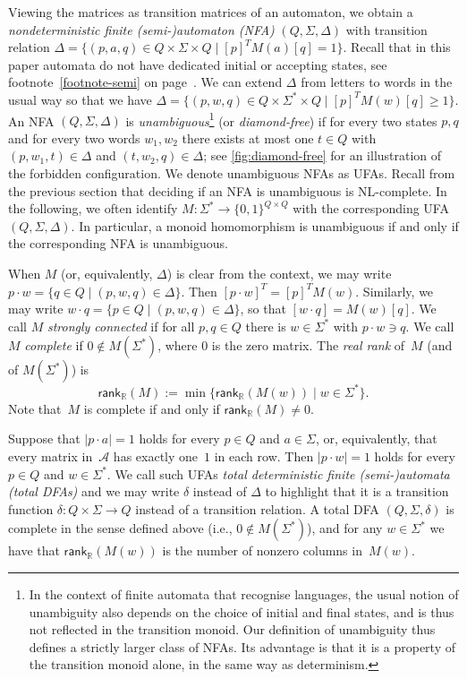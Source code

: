 \documentclass[11pt,a4paper]{amsart}
\newcommand{\Aa}{\mathcal{A}}
\newcommand{\NL}
{\textnormal{\textsf{NL}}\xspace}
\newcommand{\rkr}{\mathsf{rank}_{\mathbb{R}}}
\theoremstyle{plain}
\theoremstyle{definition}
\theoremstyle{defC}
\theoremstyle{thmC}
\theoremstyle{plain}
\numberwithin{equation}{section}
\begin{document}
\noindent
Viewing the matrices as transition matrices of an automaton, we obtain a \emph{nondeterministic finite (semi-)automaton (NFA)} $(Q, \Sigma, \Delta)$ with transition relation $\Delta = \{(p,a,q) \in Q \times \Sigma \times Q \mid [p]^T M(a) [q] = 1\}$.
Recall that in this paper automata do not have dedicated initial or accepting states, see footnote~\ref{footnote-semi} on page~\pageref{footnote-semi}.
We can extend $\Delta$ from letters to words in the usual way so that we have $\Delta = \{(p,w,q) \in Q \times \Sigma^* \times Q \mid [p]^T M(w) [q] \ge 1\}$.
An NFA $(Q, \Sigma, \Delta)$ is \emph{unambiguous}\footnote{In the context of finite automata that recognise languages, the usual notion of unambiguity also depends on the choice of initial and final states, and is thus not reflected in the transition monoid. Our definition of unambiguity thus defines a strictly larger class of NFAs. Its advantage is that it is a property of the transition monoid alone, in the same way as determinism.} (or \emph{diamond-free}) if for every two states $p,q$ and for every two words $w_1, w_2$ there exists at most one $t \in Q$ with $(p,w_1,t) \in \Delta$ and $(t,w_2,q) \in \Delta$; see \autoref{fig:diamond-free} for an illustration of the forbidden configuration. We denote unambiguous NFAs as UFAs. Recall from the previous section that deciding if an NFA is unambiguous is \NL-complete. In the following, we often identify $M \colon \Sigma^* \to \{0,1\}^{Q \times Q}$ with the corresponding UFA $(Q, \Sigma, \Delta)$. In particular, a monoid homomorphism is unambiguous if and only if the corresponding NFA is unambiguous.


When $M$ (or, equivalently, $\Delta$) is clear from the context, we may write $p \cdot w = \{q \in Q \mid (p,w,q) \in \Delta\}$.
Then $[p \cdot w]^T = [p]^T M(w)$.
Similarly, we may write $w \cdot q = \{p \in Q \mid (p,w,q) \in \Delta\}$, so that $[w \cdot q] = M(w) [q]$. 
We call $M$ \emph{strongly connected} if for all $p,q \in Q$ there is $w \in \Sigma^*$ with $p \cdot w \ni q$. 
We call $M$ \emph{complete} if $0 \not\in M(\Sigma^*)$, where $0$ is the zero matrix.
The \emph{real rank} of~$M$ (and of $M(\Sigma^*)$) is 
\[\rkr(M) := \min\{\rkr(M(w)) \mid w \in \Sigma^*\}.\]
Note that~$M$ is complete if and only if $\rkr(M) \ne 0$.

Suppose that $|p \cdot a| = 1$ holds for every $p \in Q$ and $a \in \Sigma$, or, equivalently, that every matrix in~$\Aa$ has exactly one~$1$ in each row.
Then $|p \cdot w| = 1$ holds for every $p \in Q$ and $w \in \Sigma^*$.
We call such UFAs \emph{total deterministic finite (semi-)automata (total DFAs)} and we may write $\delta$ instead of $\Delta$ to highlight that it is a transition function $\delta \colon Q \times \Sigma \to Q$ instead of a transition relation.
A total DFA $(Q, \Sigma, \delta)$ is complete in the sense defined above (i.e., $0 \not\in M(\Sigma^*)$), and for any $w \in \Sigma^*$ we have that $\rkr(M(w))$ is the number of nonzero columns in~$M(w)$.
\end{document}
